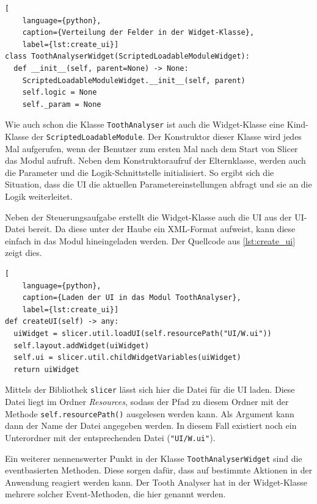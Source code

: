 \begin{lstlisting}[
    language={python},
    caption={Verteilung der Felder in der Widget-Klasse},
    label={lst:create_ui}]
class ToothAnalyserWidget(ScriptedLoadableModuleWidget):
  def __init__(self, parent=None) -> None:
    ScriptedLoadableModuleWidget.__init__(self, parent)
    self.logic = None
    self._param = None
\end{lstlisting}

Wie auch schon die Klasse \texttt{ToothAnalyser} ist auch die Widget-Klasse eine
Kind-Klasse der \texttt{ScriptedLoadableModule}. Der Konstruktor dieser Klasse wird
jedes Mal aufgerufen, wenn der Benutzer zum ersten Mal nach dem Start von Slicer
das Modul aufruft. Neben dem Konstruktoraufruf der Elternklasse, werden auch die
Parameter und die Logik-Schnittstelle initialisiert. So ergibt sich die Situation,
dass die \ac{UI} die aktuellen Parametereinstellungen abfragt und sie an die Logik
weiterleitet.

Neben der Steuerungsaufgabe erstellt die Widget-Klasse auch die \ac{UI} aus der
\ac{UI}-Datei bereit. Da diese unter der Haube ein \ac{XML}-Format aufweist,
kann diese einfach in das Modul hineingeladen werden. Der Quellcode aus \ref{lst:create_ui}
zeigt dies.

\begin{lstlisting}[
    language={python},
    caption={Laden der UI in das Modul ToothAnalyser},
    label={lst:create_ui}]
def createUI(self) -> any:
  uiWidget = slicer.util.loadUI(self.resourcePath("UI/W.ui"))
  self.layout.addWidget(uiWidget)
  self.ui = slicer.util.childWidgetVariables(uiWidget)
  return uiWidget
\end{lstlisting}

Mittels der Bibliothek \texttt{slicer} lässt sich hier die Datei für die \ac{UI}
laden. Diese Datei liegt im Ordner \textit{Resources}, sodass der Pfad zu diesem
Ordner mit der Methode \texttt{self.resourcePath()} ausgelesen werden kann. Als Argument
kann dann der Name der Datei angegeben werden. In diesem Fall existiert noch ein
Unterordner mit der entsprechenden Datei (\texttt{"UI/W.ui"}).

Ein weiterer nennenswerter Punkt in der Klasse \texttt{ToothAnalyserWidget} sind
die eventbasierten Methoden. Diese sorgen dafür, dass auf bestimmte Aktionen in
der Anwendung reagiert werden kann. Der Tooth Analyser hat in der Widget-Klasse mehrere
solcher Event-Methoden, die hier genannt werden.

